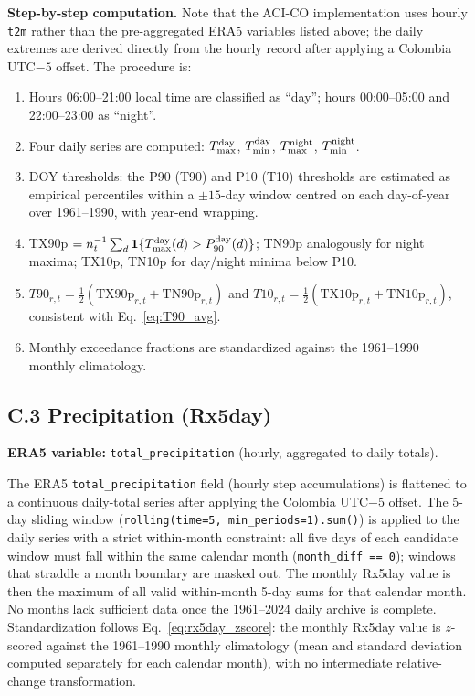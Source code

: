 \documentclass[12pt]{article}
\begin{document}
\noindent\textbf{Step-by-step computation.} Note that the ACI-CO implementation uses hourly \texttt{t2m} rather than the pre-aggregated ERA5 variables listed above; the daily extremes are derived directly from the hourly record after applying a Colombia UTC$-5$ offset. The procedure is:
\begin{enumerate}
\item Hours 06:00--21:00 local time are classified as ``day''; hours 00:00--05:00 and 22:00--23:00 as ``night''.
\item Four daily series are computed: $T_{\max}^{\rm day}$, $T_{\min}^{\rm day}$, $T_{\max}^{\rm night}$, $T_{\min}^{\rm night}$.
\item DOY thresholds: the P90 (T90) and P10 (T10) thresholds are estimated as empirical percentiles within a $\pm15$-day window centred on each day-of-year over 1961--1990, with year-end wrapping.
\item TX90p $= n_t^{-1}\sum_d\mathbf{1}\{T_{\max}^{\rm day}(d) > P_{90}^{\rm day}(d)\}$; TN90p analogously for night maxima; TX10p, TN10p for day/night minima below P10.
\item $T90_{r,t} = \tfrac{1}{2}(\mathrm{TX90p}_{r,t} + \mathrm{TN90p}_{r,t})$ and $T10_{r,t} = \tfrac{1}{2}(\mathrm{TX10p}_{r,t} + \mathrm{TN10p}_{r,t})$, consistent with Eq.~\eqref{eq:T90_avg}.
\item Monthly exceedance fractions are standardized against the 1961--1990 monthly climatology.
\end{enumerate}

\subsection*{C.3 Precipitation (Rx5day)}
 
\noindent\textbf{ERA5 variable:} \texttt{total\_precipitation} (hourly, aggregated to daily totals).
 
The ERA5 \texttt{total\_precipitation} field (hourly step accumulations) is flattened to a continuous daily-total series after applying the Colombia UTC$-5$ offset. The 5-day sliding window (\texttt{rolling(time=5, min\_periods=1).sum()}) is applied to the daily series with a strict within-month constraint: all five days of each candidate window must fall within the same calendar month (\texttt{month\_diff == 0}); windows that straddle a month boundary are masked out. The monthly Rx5day value is then the maximum of all valid within-month 5-day sums for that calendar month. No months lack sufficient data once the 1961--2024 daily archive is complete. Standardization follows Eq.~\eqref{eq:rx5day_zscore}: the monthly Rx5day value is $z$-scored against the 1961--1990 monthly climatology (mean and standard deviation computed separately for each calendar month), with no intermediate relative-change transformation.
 
\end{document}

